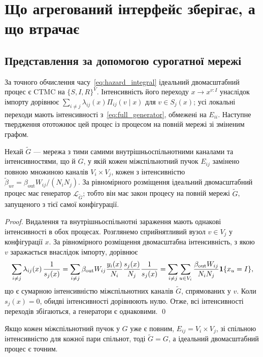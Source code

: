 \section{Що агрегований інтерфейс зберігає, а що втрачає}
\label{sec:analysis}

\subsection{Представлення за допомогою сурогатної мережі}
\label{sec:surrogate}

За точного обчислення часу~\eqref{eq:hazard_integral} ідеальний двомасштабний процес є CTMC на $\{S,I,R\}^V$. Інтенсивність його переходу $x\to x^{v:I}$ унаслідок імпорту дорівнює $\sum_{i\neq j}\lambda_{ij}(x)\Pi_{ij}(v\mid x)$ для $v\in S_j(x)$; усі локальні переходи мають інтенсивності з~\eqref{eq:full_generator}, обмежені на $E_{ii}$. Наступне твердження ототожнює цей процес із процесом на повній мережі зі зміненим графом.

\begin{proposition}
\label{prop:surrogate}
Нехай $\tilde G$ --- мережа з тими самими внутрішньоспільнотними каналами та інтенсивностями, що й $G$, у якій кожен міжспільнотний пучок $E_{ij}$ замінено повною множиною каналів $V_i\times V_j$, кожен з інтенсивністю $\tilde\beta_{uv}=\beta_{\mathrm{out}}W_{ij}/(N_iN_j)$. За рівномірного розміщення ідеальний двомасштабний процес має генератор $\mathcal{L}_{\tilde G}$; тобто він має закон процесу на повній мережі $\tilde G$, запущеного з тієї самої конфігурації.
\end{proposition}

\begin{proof}
Видалення та внутрішньоспільнотні зараження мають однакові інтенсивності в обох процесах. Розглянемо сприйнятливий вузол $v\in V_j$ у конфігурації $x$. За рівномірного розміщення двомасштабна інтенсивність, з якою $v$ заражається внаслідок імпорту, дорівнює
\[
\sum_{i\neq j}\lambda_{ij}(x)\,\frac{1}{s_j(x)}
=\sum_{i\neq j}\beta_{\mathrm{out}}W_{ij}\frac{y_i(x)}{N_i}\frac{s_j(x)}{N_j}\frac{1}{s_j(x)}
=\sum_{i\neq j}\sum_{u\in V_i}\frac{\beta_{\mathrm{out}}W_{ij}}{N_iN_j}\mathbf{1}\{x_u=I\},
\]
що є сумарною інтенсивністю міжспільнотних каналів $\tilde G$, спрямованих у $v$. Коли $s_j(x)=0$, обидві інтенсивності дорівнюють нулю. Отже, всі інтенсивності переходів збігаються, а генератори є однаковими. \qed
\end{proof}

\begin{corollary}
\label{cor:exact}
Якщо кожен міжспільнотний пучок у $G$ уже є повним, $E_{ij}=V_i\times V_j$, зі спільною інтенсивністю для кожної пари спільнот, тоді $\tilde G=G$, а ідеальний двомасштабний процес є точним.
\end{corollary}

